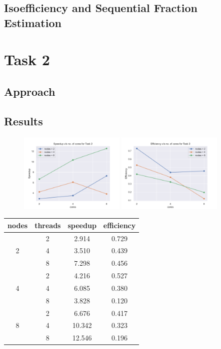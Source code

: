 \documentclass[12pt]{article}
\begin{document}
\subsection*{Isoefficiency and Sequential Fraction Estimation}

\section*{Task 2}

\subsection*{Approach}

\subsection*{Results}

\begin{figure}[!htbp]
    \centering
    \includegraphics[width=0.45\textwidth]{speedup_t2.pdf}
    \includegraphics[width=0.45\textwidth]{efficiency_t2.pdf}
\end{figure}

\begin{table}[!htbp]
    \centering
\begin{tabular}{|c|c|c|c|}
    \hline
    nodes & threads & speedup & efficiency \\

    \hline
    \multirow{3}{*}{2}
    & 2 & 2.914 & 0.729 \\
    & 4 & 3.510 & 0.439 \\
    & 8 & 7.298 & 0.456 \\

    \hline
    \multirow{3}{*}{4}
    & 2 & 4.216 & 0.527 \\
    & 4 & 6.085 & 0.380 \\
    & 8 & 3.828 & 0.120 \\

    \hline
    \multirow{3}{*}{8}
    & 2 & 6.676 & 0.417 \\
    & 4 & 10.342 & 0.323 \\
    & 8 & 12.546 & 0.196 \\
    \hline
\end{tabular}
\end{table}
\end{document}

